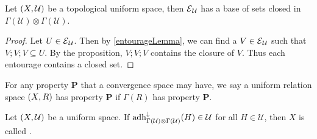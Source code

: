 \begin{corollary} \label{topologicalEntourageFilterBaseClosedSets}
Let $\sSet{X,\mathcal{U}}$ be a topological uniform space, then $\operatorname{\mathcal{E}}_\mathcal{U}$ has a base of sets closed in $\Gamma(\mathcal{U})\otimes \Gamma(\mathcal{U})$.
\end{corollary}
\begin{proof}
Let $U\in \operatorname{\mathcal{E}}_\mathcal{U}$. Then by \ref{entourageLemma}, we can find a $V\in\operatorname{\mathcal{E}}_\mathcal{U}$ such that $V;V;V\subseteq U$. By the proposition, $V;V;V$ contains the closure of $V$. Thus each entourage contains a closed set.
\end{proof}

\begin{definition}
For any property $\mathbf{P}$ that a convergence space may have, we say a uniform relation space $\sSet{X,R}$ has property $\mathbf{P}$ if $\Gamma(R)$ has property $\mathbf{P}$.
\end{definition}

\begin{definition}
Let $\sSet{X,\mathcal{U}}$ be a uniform space. If $\operatorname{adh}_{\Gamma(\mathcal{U})\otimes \Gamma(\mathcal{U})}^\downarrow(H) \in \mathcal{U}$ for all $H\in \mathcal{U}$, then $X$ is called .
\end{definition}

